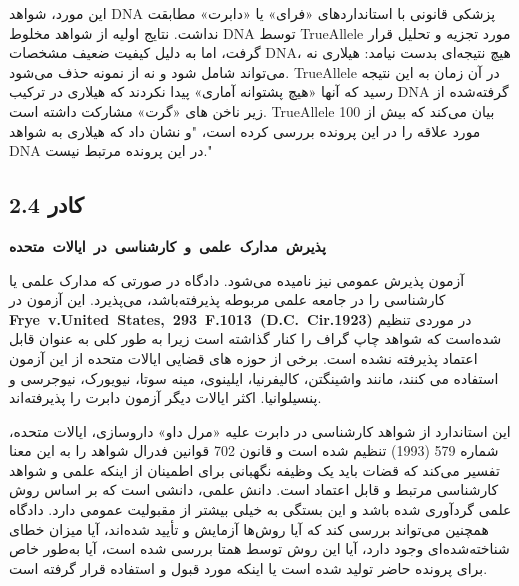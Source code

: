 این مورد، شواهد DNA پزشکی قانونی با استانداردهای «فرای» یا «دابرت» مطابقت نداشت.
نتایج اولیه از شواهد مخلوط DNA توسط TrueAllele مورد تجزیه و تحلیل قرار گرفت، اما به دلیل کیفیت ضعیف مشخصات DNA، هیچ نتیجه‌ای بدست نیامد: هیلاری نه می‌تواند شامل شود و نه از نمونه حذف می‌شود.
TrueAllele در آن زمان به این نتیجه رسید که آنها «هیچ پشتوانه آماری» پیدا نکردند که هیلاری در ترکیب DNA گرفته‌شده از زیر ناخن های «گرت» مشارکت داشته است.
TrueAllele بیان می‌کند که بیش از 100 مورد علاقه را در این پرونده بررسی کرده است، "و نشان داد که هیلاری به شواهد DNA در این پرونده مرتبط نیست."



\begin{tcolorbox}[colback=gray!10,colframe=black,breakable]

    \section*{کادر 2.4}
    \label{sec:کادر 2.4}
    \begin{Large}
        \textbf{\mbox{پذیرش مدارک علمی و کارشناسی در ایالات متحده}}
    \end{Large}
    \newline

    \begin{description}[leftmargin=0.5cm,style=nextline]
        \item[آزمون فرای:] آزمون پذیرش عمومی نیز نامیده می‌شود.
        دادگاه در صورتی که مدارک علمی یا کارشناسی را در جامعه علمی مربوطه پذیرفته‌باشد، می‌پذیرد.
        این آزمون در \textenglish{\mbox{\textbf{Frye v.United States, 293 F.1013 (D.C. Cir.1923)}}}  در موردی تنظیم شده‌است که شواهد چاپ گراف را کنار گذاشته است زیرا به طور کلی به عنوان قابل اعتماد پذیرفته نشده است.
        برخی از حوزه های قضایی ایالات متحده از این آزمون استفاده می کنند، مانند واشینگتن، کالیفرنیا، ایلینوی، مینه سوتا، نیویورک، نیوجرسی و پنسیلوانیا.
        اکثر ایالات دیگر آزمون دابرت را پذیرفته‌اند.

        \item[آزمون دابرت:] این استاندارد از شواهد کارشناسی در دابرت علیه «مرل داو» داروسازی، ایالات متحده، شماره 579 (1993) تنظیم شده است و قانون 702 قوانین فدرال شواهد را به این معنا تفسیر می‌کند که قضات باید یک وظیفه نگهبانی برای اطمینان از اینکه علمی و شواهد کارشناسی مرتبط و قابل اعتماد است.
        دانش علمی، دانشی است که بر اساس روش علمی گردآوری شده باشد و این بستگی به خیلی بیشتر از مقبولیت عمومی دارد.
        دادگاه همچنین می‌تواند بررسی کند که آیا روش‌ها آزمایش و تأیید شده‌اند، آیا میزان خطای شناخته‌شده‌ای وجود دارد، آیا این روش توسط همتا بررسی شده است، آیا به‌طور خاص برای پرونده حاضر تولید شده است یا اینکه مورد قبول و استفاده قرار گرفته است.
    \end{description}


\end{tcolorbox}

